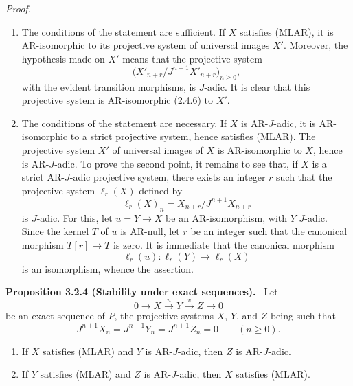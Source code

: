 \documentclass[11pt]{article}
\newenvironment{statement}[1]{\par\medskip\noindent\textbf{#1.}\ }{\par\medskip}
\newenvironment{prooftext}[1][Proof]{\par\noindent\emph{#1.}\ }{\par\medskip}
\begin{document}
\begin{prooftext}[Proof]
\begin{enumerate}[label=(\alph*)]
\item The conditions of the statement are sufficient. If $X$ satisfies (MLAR), it is AR-isomorphic to its projective system of universal images $X'$. Moreover, the hypothesis made on $X'$ means that the projective system
\[
\bigl(X'_{n+r}/J^{n+1}X'_{n+r}\bigr)_{n\ge0},
\]
with the evident transition morphisms, is $J$-adic. It is clear that this projective system is AR-isomorphic (2.4.6) to $X'$.
\item The conditions of the statement are necessary. If $X$ is AR-$J$-adic, it is AR-isomorphic to a strict projective system, hence satisfies (MLAR). The projective system $X'$ of universal images of $X$ is AR-isomorphic to $X$, hence is AR-$J$-adic. To prove the second point, it remains to see that, if $X$ is a strict AR-$J$-adic projective system, there exists an integer $r$ such that the projective system $\ell_r(X)$ defined by
\[
\ell_r(X)_n=X_{n+r}/J^{n+1}X_{n+r}
\]
is $J$-adic. For this, let $u=Y\to X$ be an AR-isomorphism, with $Y$ $J$-adic. Since the kernel $T$ of $u$ is AR-null, let $r$ be an integer such that the canonical morphism $T[r]\to T$ is zero. It is immediate that the canonical morphism
\[
\ell_r(u):\ell_r(Y)\longrightarrow\ell_r(X)
\]
is an isomorphism, whence the assertion.
\end{enumerate}
\end{prooftext}

\begin{statement}{Proposition 3.2.4 (Stability under exact sequences)}
Let
\[
0\longrightarrow X\stackrel{u}{\longrightarrow}Y\stackrel{v}{\longrightarrow}Z\longrightarrow0
\]
be an exact sequence of $P$, the projective systems $X$, $Y$, and $Z$ being such that
\[
J^{n+1}X_n=J^{n+1}Y_n=J^{n+1}Z_n=0\qquad(n\ge0).
\]
\begin{enumerate}[label=(\roman*)]
\item If $X$ satisfies (MLAR) and $Y$ is AR-$J$-adic, then $Z$ is AR-$J$-adic.
\item If $Y$ satisfies (MLAR) and $Z$ is AR-$J$-adic, then $X$ satisfies (MLAR).
\end{enumerate}
\end{statement}
\end{document}
